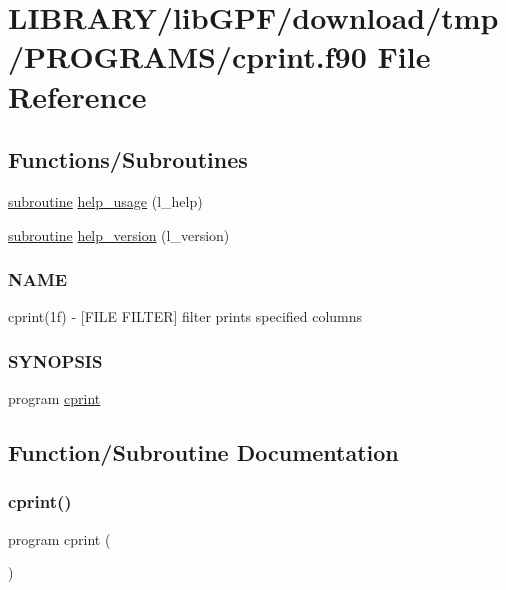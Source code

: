 \hypertarget{cprint_8f90}{}\section{L\+I\+B\+R\+A\+R\+Y/lib\+G\+P\+F/download/tmp/\+P\+R\+O\+G\+R\+A\+M\+S/cprint.f90 File Reference}
\label{cprint_8f90}
\subsection*{Functions/\+Subroutines}
\begin{DoxyCompactItemize}
\item 
\hyperlink{M__stopwatch_83_8txt_acfbcff50169d691ff02d4a123ed70482}{subroutine} \hyperlink{cprint_8f90_a3e09a3b52ee8fb04eeb93fe5761626a8}{help\+\_\+usage} (l\+\_\+help)
\item 
\hyperlink{M__stopwatch_83_8txt_acfbcff50169d691ff02d4a123ed70482}{subroutine} \hyperlink{cprint_8f90_a39c21619b08a3c22f19e2306efd7f766}{help\+\_\+version} (l\+\_\+version)
\begin{DoxyCompactList}\small\item\em \subsubsection*{N\+A\+ME}

cprint(1f) -\/ \mbox{[}F\+I\+LE F\+I\+L\+T\+ER\mbox{]} filter prints specified columns \subsubsection*{S\+Y\+N\+O\+P\+S\+IS}\end{DoxyCompactList}\item 
program \hyperlink{cprint_8f90_a24a9ebfa3b749c4ea01811ae635d6067}{cprint}
\end{DoxyCompactItemize}


\subsection{Function/\+Subroutine Documentation}
\mbox{\label{cprint_8f90_a24a9ebfa3b749c4ea01811ae635d6067}} 
\subsubsection{\texorpdfstring{cprint()}{cprint()}}
{\footnotesize\ttfamily program cprint (\begin{DoxyParamCaption}{ }\end{DoxyParamCaption})}



